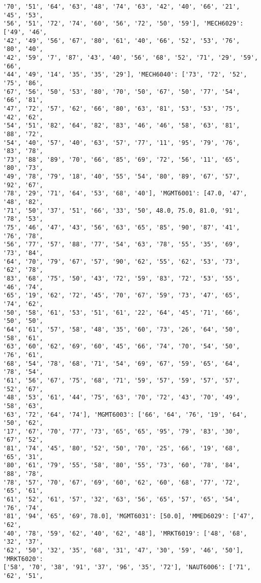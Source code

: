 \documentclass[11pt]{article}
\begin{document}
\begin{Verbatim}[commandchars=\\\{\}]
'70', '51', '64', '63', '48', '74', '63', '42', '40', '66', '21', '45', '53',
'56', '51', '72', '74', '60', '56', '72', '50', '59'], 'MECH6029': ['49', '46',
'42', '49', '56', '67', '80', '61', '40', '66', '52', '53', '76', '80', '40',
'42', '59', '7', '87', '43', '40', '56', '68', '52', '71', '29', '59', '66',
'44', '49', '14', '35', '35', '29'], 'MECH6040': ['73', '72', '52', '75', '86',
'67', '56', '50', '53', '80', '70', '50', '67', '50', '77', '54', '66', '81',
'47', '72', '57', '62', '66', '80', '63', '81', '53', '53', '75', '42', '62',
'54', '51', '82', '64', '82', '83', '46', '46', '58', '63', '81', '88', '72',
'54', '40', '57', '40', '63', '57', '77', '11', '95', '79', '76', '83', '78',
'73', '88', '89', '70', '66', '85', '69', '72', '56', '11', '65', '80', '73',
'49', '78', '79', '18', '40', '55', '54', '80', '89', '67', '57', '92', '67',
'78', '29', '71', '64', '53', '68', '40'], 'MGMT6001': [47.0, '47', '48', '82',
'71', '50', '37', '51', '66', '33', '50', 48.0, 75.0, 81.0, '91', '78', '53',
'75', '46', '47', '43', '56', '63', '65', '85', '90', '87', '41', '76', '78',
'56', '77', '57', '88', '77', '54', '63', '78', '55', '35', '69', '73', '84',
'64', '70', '79', '67', '57', '90', '62', '55', '62', '53', '73', '62', '78',
'83', '68', '75', '50', '43', '72', '59', '83', '72', '53', '55', '46', '74',
'65', '19', '62', '72', '45', '70', '67', '59', '73', '47', '65', '74', '62',
'50', '58', '61', '53', '51', '61', '22', '64', '45', '71', '66', '50', '50',
'64', '61', '57', '58', '48', '35', '60', '73', '26', '64', '50', '58', '61',
'63', '60', '62', '69', '60', '45', '66', '74', '70', '54', '50', '76', '61',
'68', '54', '78', '68', '71', '54', '69', '67', '59', '65', '64', '78', '54',
'61', '56', '67', '75', '68', '71', '59', '57', '59', '57', '57', '52', '67',
'48', '53', '61', '44', '75', '63', '70', '72', '43', '70', '49', '58', '63',
'63', '72', '64', '74'], 'MGMT6003': ['66', '64', '76', '19', '64', '50', '62',
'17', '67', '70', '77', '73', '65', '65', '95', '79', '83', '30', '67', '52',
'81', '74', '45', '80', '52', '50', '70', '25', '66', '19', '68', '65', '31',
'80', '61', '79', '55', '58', '80', '55', '73', '60', '78', '84', '88', '78',
'78', '57', '70', '67', '69', '60', '62', '60', '68', '77', '72', '65', '61',
'61', '52', '61', '57', '32', '63', '56', '65', '57', '65', '54', '76', '74',
'81', '94', '65', '69', 78.0], 'MGMT6031': [50.0], 'MMED6029': ['47', '62',
'40', '78', '59', '62', '40', '62', '48'], 'MRKT6019': ['48', '68', '32', '37',
'62', '50', '32', '35', '68', '31', '47', '30', '59', '46', '50'], 'MRKT6020':
['58', '70', '38', '91', '37', '96', '35', '72'], 'NAUT6006': ['71', '62', '51',

\end{Verbatim}
\end{document}
